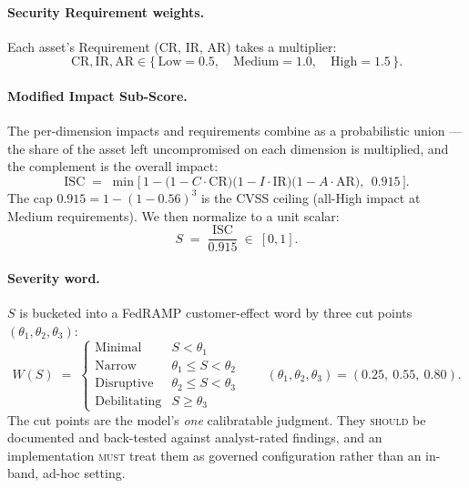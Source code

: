 \documentclass[11pt]{article}
\newcommand{\rfckw}[1]{\textsc{#1}}
\begin{document}
\paragraph{Security Requirement weights.}
Each asset's Requirement (CR, IR, AR) takes a multiplier:
\[
\mathrm{CR},\mathrm{IR},\mathrm{AR} \in \{\,\text{Low}=0.5,\quad \text{Medium}=1.0,\quad \text{High}=1.5\,\}.
\]

\paragraph{Modified Impact Sub-Score.}
The per-dimension impacts and requirements combine as a probabilistic union --- the
share of the asset left uncompromised on each dimension is multiplied, and the
complement is the overall impact:
\begin{equation}
\mathrm{ISC} \;=\; \min\!\Big[\,1 - \big(1 - C\!\cdot\!\mathrm{CR}\big)\big(1 - I\!\cdot\!\mathrm{IR}\big)\big(1 - A\!\cdot\!\mathrm{AR}\big),\ \ 0.915\,\Big].
\label{eq:isc}
\end{equation}
The cap $0.915 = 1-(1-0.56)^3$ is the CVSS ceiling (all-High impact at Medium
requirements). We then normalize to a unit scalar:
\begin{equation}
S \;=\; \frac{\mathrm{ISC}}{0.915} \ \in\ [0,1].
\label{eq:s}
\end{equation}

\paragraph{Severity word.}
\label{sec:thresholds}
$S$ is bucketed into a FedRAMP customer-effect word by three cut points
$(\theta_1,\theta_2,\theta_3)$:
\begin{equation}
W(S) \;=\;
\begin{cases}
\text{Minimal} & S < \theta_1 \\
\text{Narrow} & \theta_1 \le S < \theta_2 \\
\text{Disruptive} & \theta_2 \le S < \theta_3 \\
\text{Debilitating} & S \ge \theta_3
\end{cases}
\qquad (\theta_1,\theta_2,\theta_3) = (0.25,\ 0.55,\ 0.80).
\label{eq:word}
\end{equation}
The cut points are the model's \emph{one} calibratable judgment. They
\rfckw{should} be documented and back-tested against analyst-rated findings, and an
implementation \rfckw{must} treat them as governed configuration rather than an
in-band, ad-hoc setting.
\end{document}
